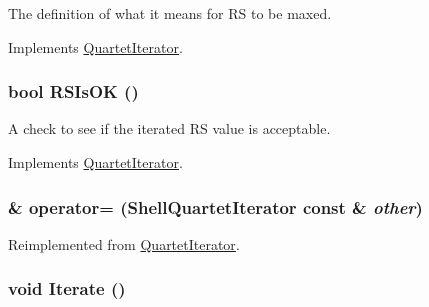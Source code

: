 The definition of what it means for RS to be maxed. 

Implements \hyperlink{classJKBuilder_1_1QuartetIterator_af88c46759ac710bbd36c17601dc62d55}{QuartetIterator}.\hypertarget{classJKBuilder_1_1ShellQuartetIterator_a13e657ea529c0566a0bf48e9c5a488d7}{
\subsubsection[{RSIsOK}]{\setlength{\rightskip}{0pt plus 5cm}bool RSIsOK ()}}
\label{classJKBuilder_1_1ShellQuartetIterator_a13e657ea529c0566a0bf48e9c5a488d7}


A check to see if the iterated RS value is acceptable. 

Implements \hyperlink{classJKBuilder_1_1QuartetIterator_ac51ff9a02f4a201598f7820476c52faf}{QuartetIterator}.\hypertarget{classJKBuilder_1_1ShellQuartetIterator_acd8ac6ed2e831bcb87e65acc0de747db}{
\subsubsection[{operator=}]{ \& operator= ({\bf ShellQuartetIterator} const \& {\em other})}}
\label{classJKBuilder_1_1ShellQuartetIterator_acd8ac6ed2e831bcb87e65acc0de747db}


Reimplemented from \hyperlink{classJKBuilder_1_1QuartetIterator_ab3cd17222545586596dbbc6aa3ca7046}{QuartetIterator}.\hypertarget{classJKBuilder_1_1QuartetIterator_a7874a07e98b52f4f147cde6f39353bae}{
\subsubsection[{Iterate}]{\setlength{\rightskip}{0pt plus 5cm}void Iterate ()}}
\label{classJKBuilder_1_1QuartetIterator_a7874a07e98b52f4f147cde6f39353bae}


